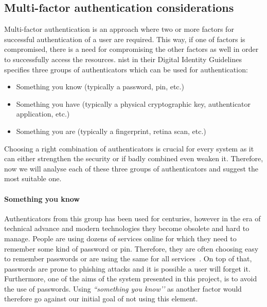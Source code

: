 \subsection{Multi-factor authentication considerations} \label{multiFA}

Multi-factor authentication is an approach where two or more factors for successful authentication of a user are required. This way, if one of factors is compromised, there is a need for compromising the other factors as well in order to successfully access the resources. \acrshort{nist} in their Digital Identity Guidelines~\cite{Grassi2017Digital3} specifies three groups of authenticators which can be used for authentication:
\begin{itemize}[noitemsep]
    \item Something you know (typically a password, \acrshort{pin}, etc.)
    \item Something you have (typically a physical cryptographic key, authenticator application, etc.)
    \item Something you are (typically a fingerprint, retina scan, etc.)
\end{itemize}

Choosing a right combination of authenticators is crucial for every system as it can either strengthen the security or if badly combined even weaken it. Therefore, now we will analyse each of these three groups of authenticators and suggest the most suitable one.

\paragraph{Something you know}
Authenticators from this group has been used for centuries, however in the era of technical advance and modern technologies they become obsolete and hard to manage. People are using dozens of services online for which they need to remember some kind of password or \acrshort{pin}. Therefore, they are often choosing easy to remember passwords or are using the same for all services~\cite{2018OnlineSurvey}. On top of that, passwords are prone to phishing attacks and it is possible a user will forget it. Furthermore, one of the aims of the system presented in this project, is to avoid the use of passwords. Using\textit{ ``something you know’’} as another factor would therefore go against our initial goal of not using this element.

